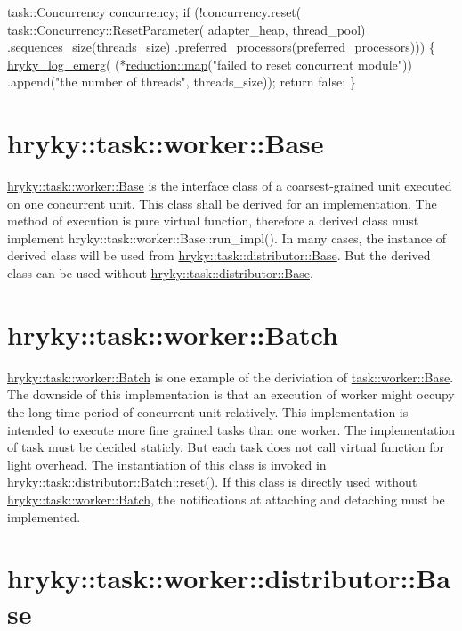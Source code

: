 \begin{DoxyCodeInclude}
    task::Concurrency concurrency;
    \textcolor{keywordflow}{if} (!concurrency.reset(
        task::Concurrency::ResetParameter(
            adapter\_heap,
            thread\_pool)
        .sequences\_size(threads\_size)
        .preferred\_processors(preferred\_processors)))
    \{
        \hyperlink{log__writer__common_8h_a8d142be5e91677a27be199c3f4115ba6}{hryky_log_emerg}(
            (*\hyperlink{namespacehryky_1_1reduction_ac5eae270cf8047b294dc4ff3e5e11a79}{reduction::map}(\textcolor{stringliteral}{"failed to reset concurrent module"}))
                .append(\textcolor{stringliteral}{"the number of threads"}, threads\_size));
        \textcolor{keywordflow}{return} \textcolor{keyword}{false};
    \}

\end{DoxyCodeInclude}
\hypertarget{hryky_1_1task_worker_Base}{}\section{hryky\-::task\-::worker\-::\-Base}\label{hryky_1_1task_worker_Base}
\hyperlink{classhryky_1_1task_1_1worker_1_1_base}{hryky\-::task\-::worker\-::\-Base} is the interface class of a coarsest-\/grained unit executed on one concurrent unit. This class shall be derived for an implementation. The method of execution is pure virtual function, therefore a derived class must implement hryky\-::task\-::worker\-::\-Base\-::run\-\_\-impl(). In many cases, the instance of derived class will be used from \hyperlink{classhryky_1_1task_1_1distributor_1_1_base}{hryky\-::task\-::distributor\-::\-Base}. But the derived class can be used without \hyperlink{classhryky_1_1task_1_1distributor_1_1_base}{hryky\-::task\-::distributor\-::\-Base}.\hypertarget{hryky_1_1task_worker_Batch}{}\section{hryky\-::task\-::worker\-::\-Batch}\label{hryky_1_1task_worker_Batch}
\hyperlink{classhryky_1_1task_1_1worker_1_1_batch}{hryky\-::task\-::worker\-::\-Batch} is one example of the deriviation of \hyperlink{classhryky_1_1task_1_1worker_1_1_base}{task\-::worker\-::\-Base}. The downside of this implementation is that an execution of worker might occupy the long time period of concurrent unit relatively. This implementation is intended to execute more fine grained tasks than one worker. The implementation of task must be decided staticly. But each task does not call virtual function for light overhead. The instantiation of this class is invoked in \hyperlink{group__task_ga9ebf9038e6e40f583b3b26866e1f8131}{hryky\-::task\-::distributor\-::\-Batch\-::reset()}. If this class is directly used without \hyperlink{classhryky_1_1task_1_1worker_1_1_batch}{hryky\-::task\-::worker\-::\-Batch}, the notifications at attaching and detaching must be implemented.\hypertarget{hryky_1_1task_worker_distributor_Base}{}\section{hryky\-::task\-::worker\-::distributor\-::\-Base}\label{hryky_1_1task_worker_distributor_Base}
